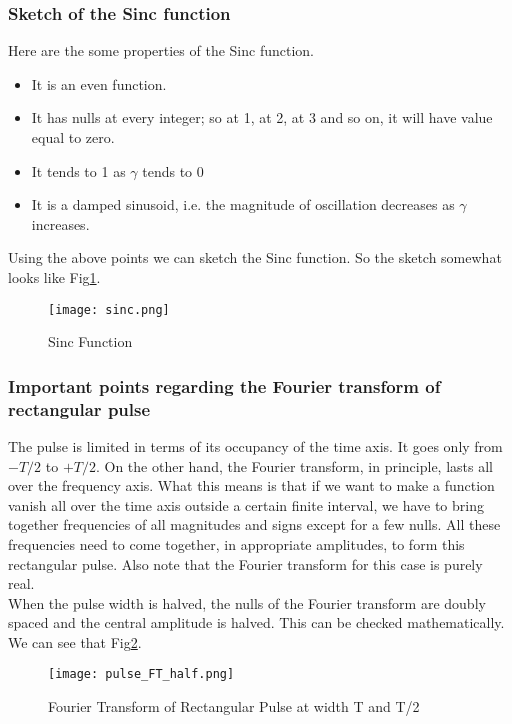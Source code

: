	\subsubsection{Sketch of the Sinc function}

		Here are the some properties of the Sinc function.
		\begin{itemize}
			\item It is an even function.
			\item It has nulls at every integer; so at 1, at 2, at 3 and so on, it will have value equal to zero.
			\item It tends to 1 as $\gamma$ tends to 0
			\item It is a damped sinusoid, i.e. the magnitude of oscillation decreases as $\gamma$ increases.
		\end{itemize}
		Using the above points we can sketch the Sinc function. So the sketch somewhat looks like Fig\ref{fig:sinc}.
		\begin{figure}[htp]
			\centering
			\texttt{[image: sinc.png]}
			\caption{Sinc Function}
			\label{fig:sinc}
		\end{figure}

	\subsubsection{Important points regarding the Fourier transform of rectangular pulse}
		The pulse is limited in terms of its occupancy of the time axis. It goes only from  $-T/2$ to $+T/2$. On the other hand, the Fourier transform, in principle, lasts all over the frequency axis.
		What this means is that if we want to make a function vanish all over the time axis outside a certain finite interval, we have to bring together frequencies of all magnitudes and signs except for a few nulls.
		All these frequencies need to come together, in appropriate amplitudes, to form this rectangular pulse. Also note that the Fourier transform for this case is purely real. \\
		 When the pulse width is halved, the nulls of the Fourier transform are doubly spaced and the central amplitude is halved. This can be checked mathematically. We can see that Fig\ref{fig:pulse_FT_half}.
		\begin{figure}[htp]
			\centering
			\texttt{[image: pulse\_FT\_half.png]}
			\caption{Fourier Transform of Rectangular Pulse at width T and T/2 }
			\label{fig:pulse_FT_half}
		\end{figure}

